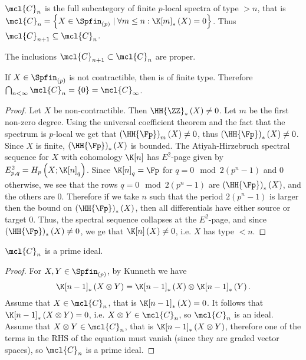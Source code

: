 \begin{corollary}
	$\mcl{C}_n$ is the full subcategory of finite $p$-local spectra of type $> n$, that is $\mcl{C}_n = \left\{ X \in \Spfin_{\left(p\right)} \mid \forall m \leq n: \K[m]_*\left(X\right) = 0 \right\}$.
	Thus $\mcl{C}_{n+1} \subseteq \mcl{C}_n$.
\end{corollary}

\begin{proposition}
	The inclusions $\mcl{C}_{n+1} \subset \mcl{C}_n$ are proper.
\end{proposition}

\begin{proposition}
	If $X \in \Spfin_{\left(p\right)}$ is not contractible, then is of finite type.
	Therefore $\bigcap_{n < \infty} \mcl{C}_n = \left\{0\right\} = \mcl{C}_\infty$.
\end{proposition}

\begin{proof}
	Let $X$ be non-contractible.
	Then $\HH{\ZZ}_*\left(X\right) \neq 0$.
	Let $m$ be the first non-zero degree.
	Using the universal coefficient theorem and the fact that the spectrum is $p$-local we get that $\left(\HH{\Fp}\right)_m\left(X\right) \neq 0$, thus $\left(\HH{\Fp}\right)_*\left(X\right) \neq 0$.
	Since $X$ is finite, $\left(\HH{\Fp}\right)_*\left(X\right)$ is bounded.
	The Atiyah-Hirzebruch spectral sequence for $X$ with cohomology $\K[n]$ has $E^2$-page given by
	$
	E_{p,q}^2
	= 
	H_p\left(X; \K[n]_q\right)
	$.
	Since $\K[n]_q = \Fp$ for $q = 0 \mod 2\left(p^n-1\right)$ and $0$ otherwise,
	we see that the rows $q = 0 \mod 2\left(p^n-1\right)$ are $\left(\HH{\Fp}\right)_*\left(X\right)$, and the others are $0$.
	Therefore if we take $n$ such that the period $2\left(p^n-1\right)$ is larger then the bound on $\left(\HH{\Fp}\right)_*\left(X\right)$, then all differentials have either source or target $0$.
	Thus, the spectral sequence collapses at the $E^2$-page, and since $\left(\HH{\Fp}\right)_*\left(X\right) \neq 0$, we ge that $\K[n]\left(X\right) \neq 0$, i.e. $X$ has type $<n$.
\end{proof}

\begin{proposition}
	$\mcl{C}_n$ is a prime ideal.
\end{proposition}

\begin{proof}
	For $X,Y \in \Spfin_{\left(p\right)}$, by Kunneth we have 
	$$
	\K[n-1]_*\left(X \otimes  Y\right)
	= \K[n-1]_*\left(X\right) \otimes \K[n-1]_*\left(Y\right).
	$$
	Assume that $X \in \mcl{C}_n$, that is $\K[n-1]_*\left(X\right) = 0$.
	It follows that $\K[n-1]_*\left(X \otimes  Y\right) = 0$, i.e. $X \otimes Y \in \mcl{C}_n$, so $\mcl{C}_n$ is an ideal.
	Assume that $X \otimes Y\in \mcl{C}_n$, that is $\K[n-1]_*\left(X \otimes  Y\right)$, therefore one of the terms in the RHS of the equation must vanish (since they are graded vector spaces), so $\mcl{C}_n$ is a prime ideal.
\end{proof}

